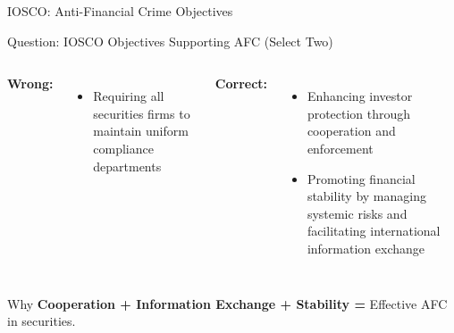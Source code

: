 \documentclass{beamer}
\begin{document}
\begin{frame}{IOSCO: Anti-Financial Crime Objectives}
\begin{block}{Question: IOSCO Objectives Supporting AFC (Select Two)}
\end{block}

\begin{columns}
\textcolor{wrong}{\textbf{ Wrong:}}
\begin{itemize}
    \item Requiring all securities firms to maintain uniform compliance departments
\end{itemize}

\textcolor{correct}{\textbf{Correct:}}
\begin{itemize}
    \item Enhancing investor protection through cooperation and enforcement
    \item Promoting financial stability by managing systemic risks and facilitating international information exchange
\end{itemize}
\end{columns}

\begin{block}{Why}
\textbf{Cooperation + Information Exchange + Stability =} Effective AFC in securities.
\end{block}
\end{frame}

\end{document}
